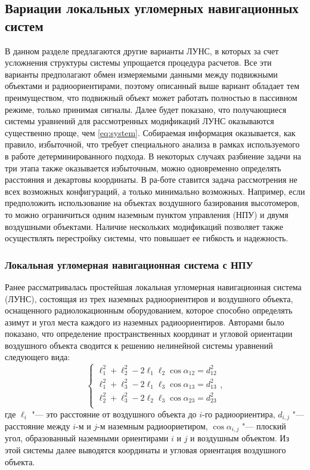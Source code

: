 \documentclass[../main.tex]{subfiles}
\begin{document}
%
%
%
%
\subsection{Вариации локальных угломерных навигационных систем}
В данном разделе предлагаются другие варианты ЛУНС, в которых за счет усложнения структуры системы упрощается процедура расчетов. Все эти варианты предполагают обмен измеряемыми данными между подвижными объектами и радиоориентирами, поэтому описанный выше вариант обладает тем преимуществом, что подвижный объект может работать полностью в пассивном режиме, только принимая сигналы. Далее будет показано, что получающиеся системы уравнений для рассмотренных модификаций ЛУНС оказываются существенно проще, чем \eqref{eq:system}. Собираемая информация оказывается, как правило, избыточной, что требует специального анализа в рамках используемого в работе детерминированного подхода. В некоторых случаях разбиение задачи на три этапа также оказывается избыточным, можно одновременно определять расстояния и декартовы координаты. В ра-боте ставится задача рассмотрения не всех возможных конфигураций, а только минимально возможных. Например, если предположить использование на объектах воздушного базирования высотомеров, то можно ограничиться одним наземным пунктом управления (НПУ) и двумя воздушными объектами. Наличие нескольких модификаций позволяет также осуществлять перестройку системы, что повышает ее гибкость и надежность.

\subsubsection{Локальная угломерная навигационная система с НПУ}
Ранее рассматривалась простейшая локальная угломерная навигационная система (ЛУНС), состоящая из трех наземных радиоориентиров и воздушного объекта, оснащенного радиолокационным оборудованием, которое способно определять азимут и угол места каждого из наземных радиоориентиров. Авторами было показано, что определение пространственных координат и угловой ориентации воздушного объекта сводится к решению нелинейной системы уравнений следующего вида:
\begin{equation}\label{eq:luns_start}
  \begin{cases}
    \ell_1^2 + \ell_2^2 - 2 \ell_1 \ell_2 \cos \alpha_{12} = d_{12}^2 \\
    \ell_1^2 + \ell_3^2 - 2 \ell_1 \ell_3 \cos \alpha_{13} = d_{13}^2 \\
    \ell_2^2 + \ell_3^2 - 2 \ell_2 \ell_3 \cos \alpha_{23} = d_{23}^2 \\
  \end{cases},
\end{equation}
где $\ell_i$ "--- это расстояние от воздушного объекта до $i$-го радиоориентира, $d_{i,j}$ "--- расстояние между $i$-м и $j$-м наземным радиоориетиром, $\cos \alpha_{i,j}$ "--- плоский угол, образованный наземными ориентирами $i$ и $j$ и воздушным объектом. Из этой системы далее выводятся координаты и угловая ориентация воздушного объекта.
\end{document}
